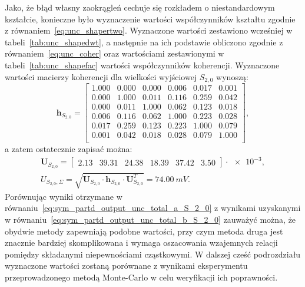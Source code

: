 Jako, że błąd własny zaokrągleń cechuje się rozkładem o niestandardowym kształcie, konieczne było wyznaczenie wartości współczynników kształtu zgodnie z równaniem~\eqref{eq:unc_shapertwo}. Wyznaczone wartości zestawiono wcześniej w tabeli~\ref{tab:unc_shapedwt}, a następnie na ich podstawie obliczono zgodnie z równaniem~\eqref{eq:unc_coher} oraz wartościami zestawionymi w tabeli~\ref{tab:unc_shapefac} wartości współczynników koherencji. Wyznaczone wartości macierzy koherencji dla wielkości wyjściowej $S_{2,0}$ wynoszą:
\begin{equation}
\mathbf{h}_{S_{2,0}} =
\begin{bmatrix}
1.000 & 0.000 & 0.000 & 0.006 & 0.017 & 0.001 \\
0.000 & 1.000 & 0.011 & 0.116 & 0.259 & 0.042 \\
0.000 & 0.011 & 1.000 & 0.062 & 0.123 & 0.018 \\
0.006 & 0.116 & 0.062 & 1.000 & 0.223 & 0.028 \\
0.017 & 0.259 & 0.123 & 0.223 & 1.000 & 0.079 \\
0.001 & 0.042 & 0.018 & 0.028 & 0.079 & 1.000 \\

\end{bmatrix}
\label{eq:sym_partd_output_unc_sumcoherval_S_2_0},
\end{equation}
a zatem ostatecznie zapisać można:
\begin{gather}
\mathbf{U}_{S_{2,0}} =
\begin{bmatrix}
\num{2.13} & \num{39.31} & \num{24.38} & \num{18.39} & \num{37.42} & \num{3.50}
\end{bmatrix} \cdot \num{e-3}
\label{eq:sym_partd_output_unc_sumuvectval_S_2_0}, \\
U_{S_{2,0},\Sigma} = \sqrt{\mathbf{U}_{S_{2,0}} \cdot \mathbf{h}_{S_{2,0}} \cdot \mathbf{U}_{S_{2,0}}^{T}} = \qty{74.00}{mV} \label{eq:sym_partd_output_unc_total_b_S_2_0}.
\end{gather}
Porównując wyniki otrzymane w równaniu~\eqref{eq:sym_partd_output_unc_total_a_S_2_0} z wynikami uzyskanymi w równaniu~\eqref{eq:sym_partd_output_unc_total_b_S_2_0} zauważyć można, że obydwie metody zapewniają podobne wartości, przy czym metoda druga jest znacznie bardziej skomplikowana i wymaga oszacowania wzajemnych relacji pomiędzy składanymi niepewnościami cząstkowymi. W dalszej cześć podrozdziału wyznaczone wartości zostaną porównane z wynikami eksperymentu przeprowadzonego metodą Monte-Carlo w celu weryfikacji ich poprawności.


